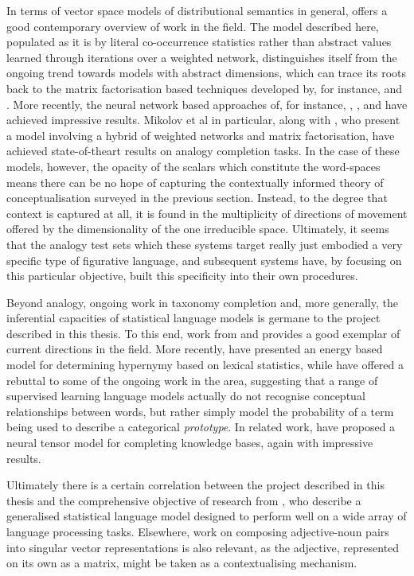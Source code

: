 In terms of vector space models of distributional semantics in general, \cite{Clark2015} offers a good contemporary overview of work in the field.  The model described here, populated as it is by literal co-occurrence statistics rather than abstract values learned through iterations over a weighted network, distinguishes itself from the ongoing trend towards models with abstract dimensions, which can trace its roots back to the matrix factorisation based techniques developed by, for instance, \cite{DeerwesterEA1990} and \cite{BleiEA2003}.  More recently, the neural network based approaches of, for instance, \cite{BengioEA2003}, \cite{CollobertEA2008}, and \cite{MikolovEA2013} have achieved impressive results.  Mikolov et al in particular, along with \cite{PenningtonEA2014}, who present a model involving a hybrid of weighted networks and matrix factorisation, have achieved state-of-theart results on analogy completion tasks.  In the case of these models, however, the opacity of the scalars which constitute the word-spaces means there can be no hope of capturing the contextually informed theory of conceptualisation surveyed in the previous section.  Instead, to the degree that context is captured at all, it is found in the multiplicity of directions of movement offered by the dimensionality of the one irreducible space.  Ultimately, it seems that the analogy test sets which these systems target really just embodied a very specific type of figurative language, and subsequent systems have, by focusing on this particular objective, built this specificity into their own procedures.

Beyond analogy, ongoing work in taxonomy completion and, more generally, the inferential capacities of statistical language models is germane to the project described in this thesis.  To this end, work from \cite{CimianoEA2003} and \cite{SnowEA2006} provides a good exemplar of current directions in the field.  More recently, \cite{SantusEA2014} have presented an energy based model for determining hypernymy based on lexical statistics, while \cite{LevyEA2015} have offered a rebuttal to some of the ongoing work in the area, suggesting that a range of supervised learning language models actually do not recognise conceptual relationships between words, but rather simply model the probability of a term being used to describe a categorical \emph{prototype}.  In related work, \cite{SocherEA2013} have proposed a neural tensor model for completing knowledge bases, again with impressive results.

Ultimately there is a certain correlation between the project described in this thesis and the comprehensive objective of research from \cite{BaroniEA2010b}, who describe a generalised statistical language model designed to perform well on a wide array of language processing tasks.  Elsewhere,  work on composing adjective-noun pairs into singular vector representations is also relevant, as the adjective, represented on its own as a matrix, might be taken as a contextualising mechanism.

